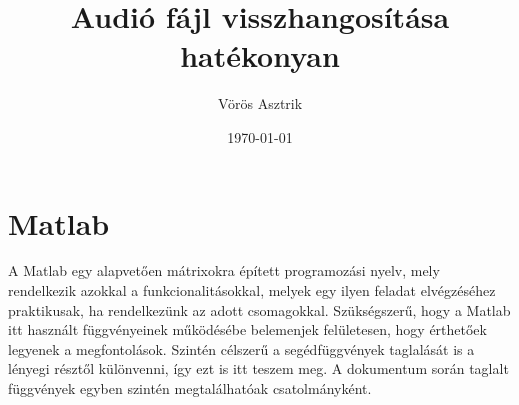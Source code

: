 \documentclass{article}
\title{Audió fájl visszhangosítása hatékonyan}
\author{Vörös Asztrik}
\date{\today}
\begin{document}
\maketitle
{}

\section*{Matlab}
	A Matlab egy alapvetően mátrixokra épített programozási nyelv, mely rendelkezik azokkal a funkcionalitásokkal, melyek egy ilyen feladat elvégzéséhez praktikusak, ha rendelkezünk az adott csomagokkal. Szükségszerű, hogy a Matlab itt használt függvényeinek működésébe belemenjek felületesen, hogy érthetőek legyenek a megfontolások. Szintén célszerű a segédfüggvények taglalását is a lényegi résztől különvenni, így ezt is itt teszem meg. A dokumentum során taglalt függvények egyben szintén megtalálhatóak csatolmányként.
\end{document}
